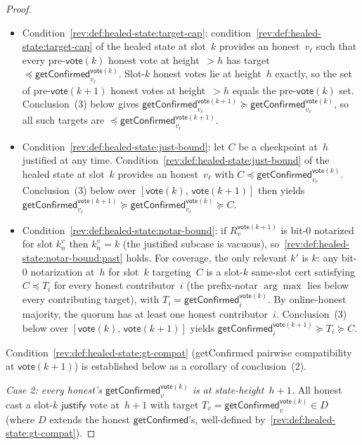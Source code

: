 \documentclass{article}
\newcommand{\just}{\ensuremath{\mathsf{justify}}\xspace}
\newcommand{\vote}{\mathsf{vote}}
\newcommand{\getConfirmed}{\textsf{getConfirmed}\xspace}
\theoremstyle{plain}
\theoremstyle{definition}
\theoremstyle{remark}
\newcommand{\OHM}{online-honest majority\xspace}
\begin{document}
\begin{proof}
\begin{itemize}
  \item Condition~\ref{rev:def:healed-state:target-cap}: condition~\ref{rev:def:healed-state:target-cap} of the healed state at slot~$k$ provides an honest~$v_\ell$ such that every pre-$\vote(k)$ honest vote at height~$>h$ has target~$\preceq \getConfirmed_{v_\ell}^{\vote(k)}$. Slot-$k$ honest votes lie at height~$h$ exactly, so the set of pre-$\vote(k+1)$ honest votes at height~$>h$ equals the pre-$\vote(k)$ set. Conclusion~(3) below gives $\getConfirmed_{v_\ell}^{\vote(k+1)} \succeq \getConfirmed_{v_\ell}^{\vote(k)}$, so all such targets are $\preceq \getConfirmed_{v_\ell}^{\vote(k+1)}$.
  \item Condition~\ref{rev:def:healed-state:just-bound}: let $C$ be a checkpoint at~$h$ justified at any time. Condition~\ref{rev:def:healed-state:just-bound} of the healed state at slot~$k$ provides an honest~$v_\ell$ with $C \preceq \getConfirmed_{v_\ell}^{\vote(k)}$. Conclusion~(3) below over $[\vote(k),\, \vote(k+1)]$ then yields $\getConfirmed_{v_\ell}^{\vote(k+1)} \succeq \getConfirmed_{v_\ell}^{\vote(k)} \succeq C$.
  \item Condition~\ref{rev:def:healed-state:notar-bound}: if $R_v^{\vote(k+1)}$ is bit-$0$ notarized for slot $k_n^v$ then $k_n^v = k$ (the justified subcase is vacuous), so~\ref{rev:def:healed-state:notar-bound:past} holds. For coverage, the only relevant $k'$ is $k$: any bit-$0$ notarization at~$h$ for slot~$k$ targeting~$C$ is a slot-$k$ same-slot cert satisfying $C \preceq T_i$ for every honest contributor~$i$ (the prefix-notar $\arg\max$ lies below every contributing target), with $T_i = \getConfirmed_i^{\vote(k)}$. By \OHM, the quorum has at least one honest contributor~$i$. Conclusion~(3) below over $[\vote(k),\, \vote(k+1)]$ yields $\getConfirmed_i^{\vote(k+1)} \succeq T_i \succeq C$.
\end{itemize}
Condition~\ref{rev:def:healed-state:gt-compat} (\getConfirmed{} pairwise compatibility at $\vote(k+1)$) is established below as a corollary of conclusion~(2).

\emph{Case 2: every honest's $\getConfirmed_v^{\vote(k)}$ is at state-height~$h+1$.}
All honest cast a slot-$k$ \just vote at~$h+1$ with target $T_v = \getConfirmed_v^{\vote(k)} \in D$ (where $D$ extends the honest $\getConfirmed$'s, well-defined by~\ref{rev:def:healed-state:gt-compat}).


\end{proof}
\end{document}
